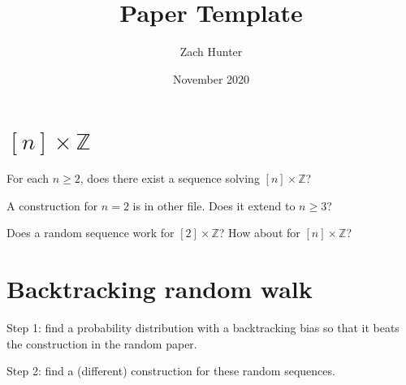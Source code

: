 \documentclass[a4paper]{article}
\title{Paper Template}
\author{Zach Hunter}
\date{November 2020}
\newcommand{\Z}{\mathbb{Z}}
\theoremstyle{definition}
\begin{document}
\maketitle





\section{\texorpdfstring{$[n]\times\Z$}{[m]xZ}}

For each $n \ge 2$, does there exist a sequence solving $[n]\times\mathbb{Z}$?

A construction for $n=2$ is in other file. Does it extend to $n \ge 3$?

Does a random sequence work for $[2]\times\Z$? How about for $[n]\times\Z$?

\section{Backtracking random walk}

Step 1: find a probability distribution with a backtracking bias so that it beats the construction in the random paper. 

Step 2: find a (different) construction for these random sequences. 
\end{document}
